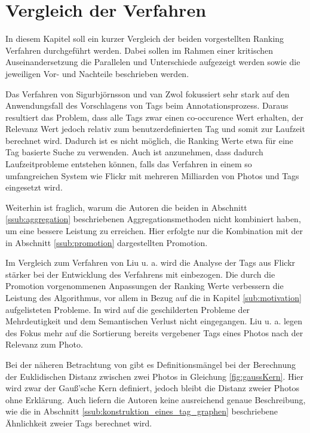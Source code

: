 \section{Vergleich der Verfahren} %
\label{sec:vergleich_und_bewertung_der_verfahren}

In diesem Kapitel soll ein kurzer Vergleich der beiden vorgestellten Ranking Verfahren durchgeführt werden. Dabei sollen im Rahmen einer kritischen Auseinandersetzung die Parallelen und Unterschiede aufgezeigt werden sowie die jeweiligen Vor- und Nachteile beschrieben werden.

Das Verfahren von Sigurbjörnsson und van Zwol fokussiert sehr stark auf den Anwendungsfall des Vorschlagens von Tags beim Annotationsprozess. Daraus resultiert das Problem, dass alle Tags zwar einen co-occurence Wert erhalten, der Relevanz Wert jedoch relativ zum benutzerdefinierten Tag und somit zur Laufzeit berechnet wird. Dadurch ist es nicht möglich, die Ranking Werte etwa für eine Tag basierte Suche zu verwenden. Auch ist anzunehmen, dass dadurch Laufzeitprobleme entstehen können, falls das Verfahren in einem so umfangreichen System wie Flickr mit mehreren Milliarden von Photos und Tags eingesetzt wird.

Weiterhin ist fraglich, warum die Autoren die beiden in Abschnitt \ref{ssub:aggregation} beschriebenen Aggregationsmethoden nicht kombiniert haben, um eine bessere Leistung zu erreichen. Hier erfolgte nur die Kombination mit der in Abschnitt \ref{ssub:promotion} dargestellten Promotion.

Im Vergleich zum Verfahren von Liu u. a. wird die Analyse der Tags aus Flickr stärker bei der Entwicklung des Verfahrens mit einbezogen. Die durch die Promotion vorgenommenen Anpassungen der Ranking Werte verbessern die Leistung des Algorithmus, vor allem in Bezug auf die in Kapitel \ref{sub:motivation} aufgelisteten Probleme. In \cite{ranking} wird auf die geschilderten Probleme der Mehrdeutigkeit und dem Semantischen Verlust nicht eingegangen. Liu u. a. legen des Fokus mehr auf die Sortierung bereits vergebener Tags eines Photos nach der Relevanz zum Photo.

Bei der näheren Betrachtung von \cite{ranking} gibt es Definitionsmängel bei der Berechnung der Euklidischen Distanz zwischen zwei Photos in Gleichung \ref{fig:gaussKern}. Hier wird zwar der Gauß'sche Kern definiert, jedoch bleibt die Distanz zweier Photos ohne Erklärung. Auch liefern die Autoren keine ausreichend genaue Beschreibung, wie die in Abschnitt \ref{ssub:konstruktion_eines_tag_graphen} beschriebene Ähnlichkeit zweier Tags berechnet wird. 

